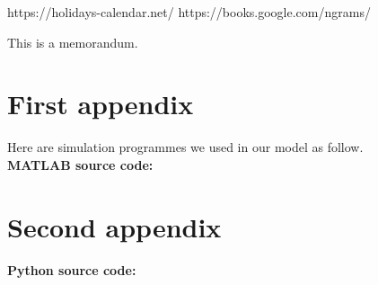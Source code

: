 \documentclass{mcmthesis}  %
\begin{document}
\begin{thebibliography}{99}
         https://holidays-calendar.net/
         https://books.google.com/ngrams/
\end{thebibliography}

\printbibliography  %


\begin{appendices}  %

\begin{memo}[Memorandum]  %
	This is a memorandum.
\end{memo}  %

\section{First appendix}  %

Here are simulation programmes we used in our model as follow.\\
\textbf{MATLAB source code:}
%

\section{Second appendix}  %

\textbf{Python source code:}
%

\end{appendices}  %
\end{document}
